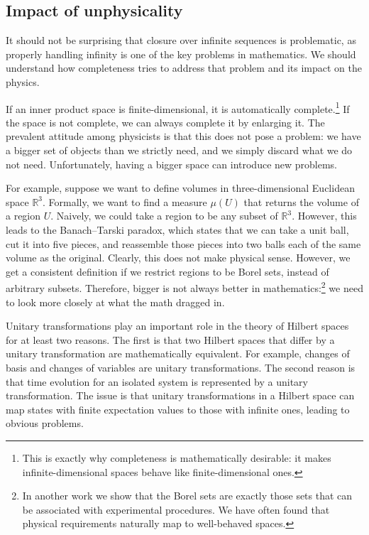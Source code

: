 \documentclass[10pt,twocolumn, nofootinbib]{revtex4-2}
\begin{document}
\subsection{Impact of unphysicality}

It should not be surprising that closure over infinite sequences is problematic, as properly handling infinity is one of the key problems in mathematics. We should understand how completeness tries to address that problem and its impact on the physics.

If an inner product space is finite-dimensional, it is automatically complete.\footnote{This is exactly why completeness is mathematically desirable: it makes infinite-dimensional spaces behave like finite-dimensional ones.} If the space is not complete, we can always complete it by enlarging it. The prevalent attitude among physicists is that this does not pose a problem: we have a bigger set of objects than we strictly need, and we simply discard what we do not need. Unfortunately, having a bigger space can introduce new problems.

For example, suppose we want to define volumes in three-dimensional Euclidean space $\mathbb{R}^3$. Formally, we want to find a measure $\mu(U)$ that returns the volume of a region $U$. Naively, we could take a region to be any subset of $\mathbb{R}^3$. However, this leads to the Banach–Tarski paradox,\cite{tao2021introduction} which states that we can take a unit ball, cut it into five pieces, and reassemble those pieces into two balls each of the same volume as the original. Clearly, this does not make physical sense. However, we get a consistent definition if we restrict regions to be Borel sets, instead of arbitrary subsets. Therefore, bigger is not always better in mathematics:\footnote{In another work\cite{aop-book} we show that the Borel sets are exactly those sets that can be associated with experimental procedures. We have often found that physical requirements naturally map to well-behaved spaces.} we need to look more closely at what the math dragged in.

Unitary transformations play an important role in the theory of Hilbert spaces for at least two reasons. The first is that two Hilbert spaces that differ by a unitary transformation are mathematically equivalent. For example, changes of basis and changes of variables are unitary transformations. The second reason is that time evolution for an isolated system is represented by a unitary transformation. The issue is that unitary transformations in a Hilbert space can map states with finite expectation values to those with infinite ones, leading to obvious problems.
\end{document}
